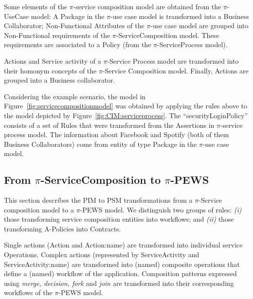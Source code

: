 \documentclass{singlecol-new}
\theoremstyle{TH}{
\newtheorem{lemma}{Lemma}
\newtheorem{theorem}[lemma]{Theorem}
\newtheorem{corrolary}[lemma]{Corrolary}
\newtheorem{conjecture}[lemma]{Conjecture}
\newtheorem{proposition}[lemma]{Proposition}
\newtheorem{claim}[lemma]{Claim}
\newtheorem{stheorem}[lemma]{Wrong Theorem}
\newtheorem{algorithm}{Algorithm}
}
\theoremstyle{THrm}{
\newtheorem{definition}{Definition}[section]
\newtheorem{question}{Question}[section]
\newtheorem{remark}{Remark}
\newtheorem{scheme}{Scheme}
}
\theoremstyle{THhit}{
\newtheorem{case}{Case}[section]
}
\theoremstyle{THhsl}{
\newtheorem{example}{Example}
}
\begin{document}
Some elements of the $\pi$-service composition model are obtained from the $\pi$-UseCase model: 
A {\sf Package} in the $\pi$-use case model is transformed into a {\sf Business Collaborator};
\textsf{Non-Functional Attributes} of the $\pi$-use case model are grouped into \textsf{Non-Functional requirements} of the $\pi$-ServiceComposition model. 
These requirements are associated to a \textsf{Policy} (from the $\pi$-ServiceProcess model).




{\sf Actions} and {\sf Service activity} of a $\pi$-Service Process model are transformed into their hom\-onym concepts of the $\pi$-Service Composition model.
Finally, {\sf Actions} are grouped into  a {\sf Business collaborator}.


\begin{example}\label{ex:toPublicMusicT5}
Considering the example scenario, the model in Figure~\ref{fig:servicecompositionmodel} was obtained by applying the rules above to the model depicted by Figure~\ref{fig:CIM:serviceprocess}.  
The ``securityLoginPolicy'' consists of a set of {\sf Rules} that were transformed from the {\sf Assertions} in $\pi$-service process model. 
The information about Facebook and Spotify (both of them {\sf Business Collaborators}) come from entity of type {\sc Package} in the $\pi$-use case
model.
\end{example}

\subsection{From $\pi$-ServiceComposition to $\pi$-PEWS}

This section describes the PIM to PSM transformations from a $\pi$-Service composition mod\-el to a $\pi$-PEWS model. 
We distinguish two groups of rules: \textit{(i)} those transforming service composition entities into workflows; and \textit{(ii)} those transforming  A-Policies into Contracts.

Single actions ({\sf Action} and {\sf
Action:name}) are transformed into individual service {\sf Operations}.
Complex actions (rep\-re\-sented by {\sf ServiceActivity}  and  {\sf
ServiceActivity:name}) are transformed into (named) composite
operations that define a (named) workflow of the application.
Composition patterns expressed using  {\em merge, decision, fork} and {\em join} are transformed into their corresponding workflows of the $\pi$-PEWS model.
\end{document}
